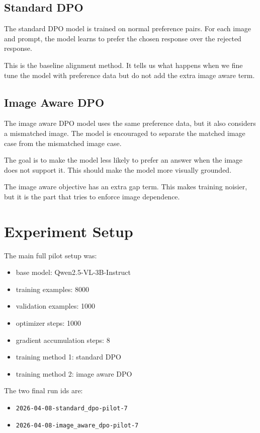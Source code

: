 \documentclass{article}
\begin{document}
\subsection{Standard DPO}
The standard DPO model is trained on normal preference pairs.
For each image and prompt, the model learns to prefer the chosen response over the rejected response.

This is the baseline alignment method.
It tells us what happens when we fine tune the model with preference data but do not add the extra image aware term.

\subsection{Image Aware DPO}
The image aware DPO model uses the same preference data, but it also considers a mismatched image.
The model is encouraged to separate the matched image case from the mismatched image case.

The goal is to make the model less likely to prefer an answer when the image does not support it.
This should make the model more visually grounded.

The image aware objective has an extra gap term.
This makes training noisier, but it is the part that tries to enforce image dependence.

\section{Experiment Setup}
The main full pilot setup was:

\begin{itemize}
    \item base model: Qwen2.5-VL-3B-Instruct
    \item training examples: 8000
    \item validation examples: 1000
    \item optimizer steps: 1000
    \item gradient accumulation steps: 8
    \item training method 1: standard DPO
    \item training method 2: image aware DPO
\end{itemize}

The two final run ids are:

\begin{itemize}
    \item \texttt{2026-04-08-standard\_dpo-pilot-7}
    \item \texttt{2026-04-08-image\_aware\_dpo-pilot-7}
\end{itemize}
\end{document}
